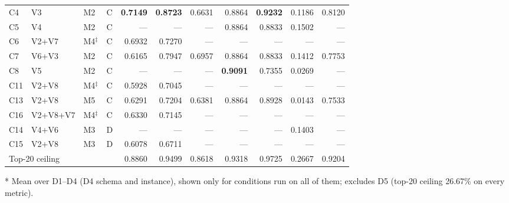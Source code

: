\begin{table}[t]
\begin{threeparttable}
\begin{tabular}{llllrrrrrrr}
C4 & V3 & M2 & C & \textbf{0.7149} & \textbf{0.8723} & 0.6631 & 0.8864 & \textbf{0.9232} & 0.1186 & 0.8120 \\
C5 & V4 & M2 & C & --- & --- & --- & 0.8864 & 0.8833 & 0.1502 & --- \\
C6 & V2+V7 & M4$^\ddagger$ & C & 0.6932 & 0.7270 & --- & --- & --- & --- & --- \\
C7 & V6+V3 & M2 & C & 0.6165 & 0.7947 & 0.6957 & 0.8864 & 0.8833 & 0.1412 & 0.7753 \\
C8 & V5 & M2 & C & --- & --- & --- & \textbf{0.9091} & 0.7355 & 0.0269 & --- \\
C11 & V2+V8 & M4$^\ddagger$ & C & 0.5928 & 0.7045 & --- & --- & --- & --- & --- \\
C13 & V2+V8 & M5 & C & 0.6291 & 0.7204 & 0.6381 & 0.8864 & 0.8928 & 0.0143 & 0.7533 \\
C16 & V2+V8+V7 & M4$^\ddagger$ & C & 0.6330 & 0.7145 & --- & --- & --- & --- & --- \\
\hline
C14 & V4+V6 & M3 & D & --- & --- & --- & --- & --- & 0.1403 & --- \\
C15 & V2+V8 & M3 & D & 0.6078 & 0.6711 & --- & --- & --- & --- & --- \\
\hline
\multicolumn{4}{l}{Top-20 ceiling} & 0.8860 & 0.9499 & 0.8618 & 0.9318 & 0.9725 & 0.2667 & 0.9204 \\
\hline
\end{tabular}
\begin{tablenotes}
\item[*] Mean over D1--D4 (D4 schema and instance), shown only for conditions run on all of them; excludes D5 (top-20 ceiling 26.67\% on every metric).
\end{tablenotes}
\end{threeparttable}
\end{table}
